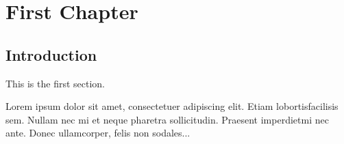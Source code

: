 \documentclass{book}
\begin{document}

    \chapter{First Chapter}

    \section{Introduction}

    This is the first section.
    
    Lorem  ipsum  dolor  sit  amet,  consectetuer  adipiscing  
    elit. Etiam  lobortisfacilisis sem.  Nullam nec mi et 
    neque pharetra sollicitudin.  Praesent imperdietmi nec ante. 
    Donec ullamcorper, felis non sodales...
\end{document}
